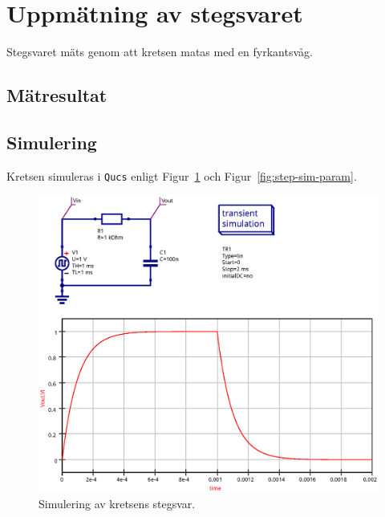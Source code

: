 %
%

\section{Uppmätning av stegsvaret}\label{step}
Stegsvaret mäts genom att kretsen matas med en fyrkantsvåg.

\subsection{Mätresultat}\label{}


\subsection{Simulering}\label{}
Kretsen simuleras i \texttt{Qucs} enligt Figur~\ref{fig:step-sim-step} och
Figur~\ref{fig:step-sim-param}.

\begin{figure}[ht]
    \centering
    \includegraphics[width=\linewidth]{sim/ee466_lab-4_prj/uppgift-2_step}
    \caption[] {Simulering av kretsens stegsvar.}
    \label{fig:step-sim-step}
\end{figure}

